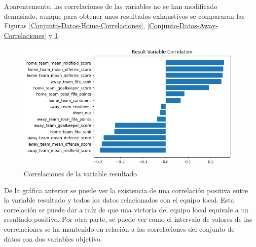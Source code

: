 Aparentemente, las correlaciones de las variables no se han modificado demasiado, aunque para obtener unos resultados exhaustivos se compararan las Figuras \ref{Conjunto-Datos-Home-Correlaciones}, \ref{Conjunto-Datos-Away-Correlaciones} y \ref{Conjunto-Datos-Resultado-Correlaciones}.

\begin{figure}[H]
\centering
\includegraphics[width=\smallSize]{images/resultCorrelation.png}
\caption{Correlaciones de la variable resultado}
\label{Conjunto-Datos-Resultado-Correlaciones}
\end{figure}

De la gráfica anterior se puede ver la existencia de una correlación positiva entre la variable resultado y todos los datos relacionados con el equipo local. Esta correlación se puede dar a raíz de que una victoria del equipo local equivale a un resultado positivo. Por otra parte, se puede ver como el intervalo de valores de las correlaciones se ha mantenido en relación a las correlaciones del conjunto de datos con dos variables objetivo.